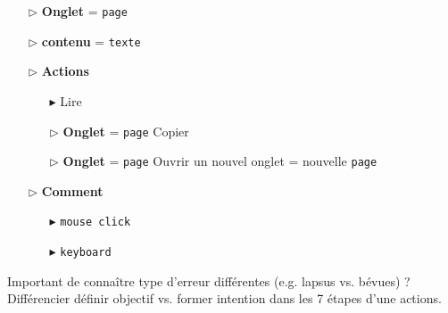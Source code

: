 \documentclass{report}
\begin{document}
\begin{multicols*}{3}
\begin{itemize}
    \begin{itemize}
      \item [$\rhd$ ] \textbf{Onglet} = \texttt{page}     
      \item [$\rhd$ ] \textbf{contenu} = \texttt{texte}     
      \item [$\rhd$ ] \textbf{Actions}     
        \begin{itemize}
          \item [$\blacktriangleright$ ]
            Lire
      \item [$\rhd$ ] \textbf{Onglet} = \texttt{page}     
            Copier 
      \item [$\rhd$ ] \textbf{Onglet} = \texttt{page}     
            Ouvrir un nouvel onglet = nouvelle \texttt{page}  
        \end{itemize}
       \item [$\rhd$ ] \textbf{Comment}      
        \begin{itemize}
          \item [$\blacktriangleright$ ] 
            \texttt{mouse click}  
          \item [$\blacktriangleright$ ] 
            \texttt{keyboard}  
        \end{itemize}
    \end{itemize}
    
    
    









    

        




    \end{itemize}

    Important de connaître type d'erreur 
    différentes (e.g. lapsus vs. bévues) ?
    Différencier 
    définir objectif vs. former intention 
    dans les 7 étapes d'une actions. 





    




     


    \end{multicols*}
\end{document}
